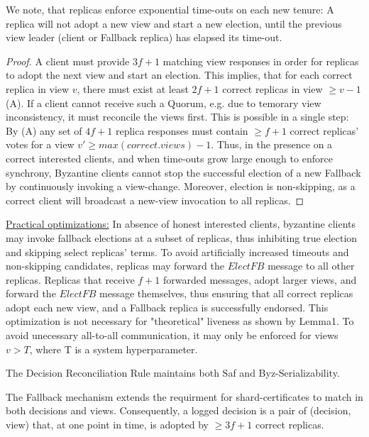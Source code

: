 We note, that replicas enforce exponential time-outs on each new tenure: A replica will not adopt a new view and start a new election, until the previous view leader (client or Fallback replica) has elapsed its time-out.

\begin{proof}
A client must provide $3f+1$ matching view responses in order for replicas to adopt the next view and start an election. This implies, that for each correct replica in view $v$, there must exist at least $2f+1$ correct replicas in view $\geq v-1$ (A).
If a client cannot receive such a Quorum, e.g. due to temorary view inconsistency, it must reconcile the views first. This is possible in a single step: By (A) any set of $4f+1$ replica responses must contain $\geq f+1$ correct replicas' votes for a view $v' \geq max(correct.views) -1 $. 
Thus, in the presence on a correct interested clients, and when time-outs grow large enough to enforce synchrony, Byzantine clients cannot stop the successful election of a new Fallback by continuously invoking a view-change. Moreover, election is non-skipping, as a correct client will broadcast a new-view invocation to all replicas. 
\end{proof}

\underline{Practical optimizations:}  In absence of honest interested clients, byzantine clients may invoke fallback elections at a subset of replicas, thus inhibiting true election and skipping select replicas' terms. To avoid artificially increased timeouts and non-skipping candidates, replicas may forward the $ElectFB$ message to all other replicas. Replicas that receive $f+1$ forwarded messages, adopt larger views, and forward the $ElectFB$ message themselves, thus ensuring that all correct replicas adopt each new view, and a Fallback replica is successfully endorsed.
This optimization is not necessary for "theoretical" liveness as shown by Lemma1. To avoid unecessary all-to-all communication, it may only be enforced for views $v > T$, where T is a system hyperparameter.





\begin{lemma}
The Decision Reconciliation Rule maintains both Saf and Byz-Serializability.
\end{lemma}

The Fallback mechanism extends the requirment for shard-certificates to match in both decisions and views. Consequently, a logged decision is a pair of (decision, view) that, at one point in time, is adopted by $\geq 3f+1$  correct replicas.

